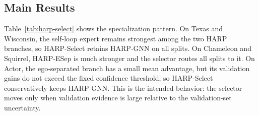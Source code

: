 \documentclass[letterpaper]{article} %
\newcommand{\base}{HARP-GNN}
\newcommand{\esep}{HARP-ESep}
\newcommand{\method}{HARP-Select}
\newcommand{\papertablesize}{\footnotesize}
\begin{document}
\begin{table}[t]
\centering
\caption{External critical-heterophily comparison against the strongest implemented non-HARP baseline. Best is the strongest non-HARP mean accuracy on that dataset. Diff is \method{} minus that best baseline over paired fixed splits; Holm $p$ is the exact sign-flip value after correction across the two \method{} rows.}
\label{tab:critical-external-main}
\begingroup
\setlength{\tabcolsep}{2.2pt}
\renewcommand{\arraystretch}{1.08}
\papertablesize
{}
\endgroup
\end{table}

\begin{table}[t]
\centering
\caption{Binary critical-heterophily branch comparisons under ROC-AUC over 10 fixed splits. Diff is measured in ROC-AUC percentage points and equals \esep{} minus \base.}
\label{tab:binary-critical}
\begingroup
\setlength{\tabcolsep}{2pt}
\renewcommand{\arraystretch}{1.08}
\papertablesize
{}
\endgroup
\end{table}

\subsection{Main Results}

Table~\ref{tab:harp-select} shows the specialization pattern.
On Texas and Wisconsin, the self-loop expert remains strongest among the two HARP branches, so \method{} retains \base{} on all splits.
On Chameleon and Squirrel, \esep{} is much stronger and the selector routes all splits to it.
On Actor, the ego-separated branch has a small mean advantage, but its validation gains do not exceed the fixed confidence threshold, so \method{} conservatively keeps \base.
This is the intended behavior: the selector moves only when validation evidence is large relative to the validation-set uncertainty.
\end{document}

